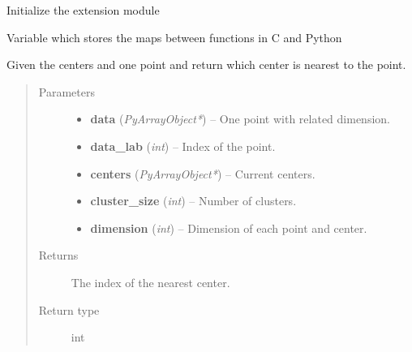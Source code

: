\documentclass[letterpaper,10pt,english]{sphinxmanual}
\begin{document}

\begin{fulllineitems}
\label{kmeans:c.initkmeans_c_extension}
Initialize the extension module

\end{fulllineitems}


\begin{fulllineitems}
\label{kmeans:c.kmeans_c_extensionMethods}
Variable which stores the maps between functions in C and Python

\end{fulllineitems}


\begin{fulllineitems}
\label{kmeans:c.closest_center}
Given the centers and one point and return which center is nearest to the point.
\begin{quote}\begin{description}
\item[{Parameters}] \leavevmode\begin{itemize}
\item {} 
\textbf{data} (\emph{PyArrayObject*}) -- One point with related dimension.

\item {} 
\textbf{data\_lab} (\emph{int}) -- Index of the point.

\item {} 
\textbf{centers} (\emph{PyArrayObject*}) -- Current centers.

\item {} 
\textbf{cluster\_size} (\emph{int}) -- Number of clusters.

\item {} 
\textbf{dimension} (\emph{int}) -- Dimension of each point and center.

\end{itemize}

\item[{Returns}] \leavevmode
The index of the nearest center.

\item[{Return type}] \leavevmode
int

\end{description}\end{quote}

\end{fulllineitems}
\end{document}
